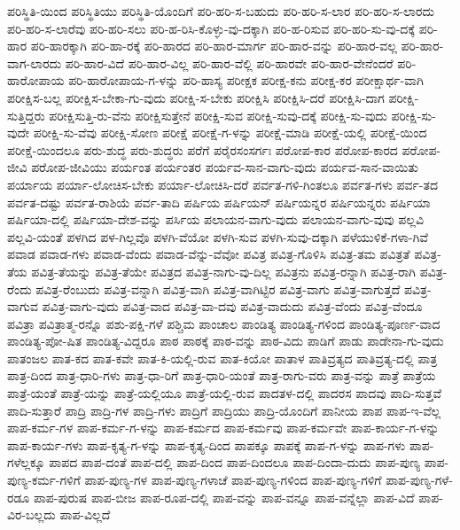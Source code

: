 {ಪರಿಸ್ಥಿತಿ-ಯಿಂದ
ಪರಿಸ್ಥಿತಿಯು
ಪರಿಸ್ಥಿತಿ-ಯೊಂದಿಗೆ
ಪರಿ-ಹರಿ-ಸ-ಬಹುದು
ಪರಿ-ಹರಿ-ಸ-ಲಾರ
ಪರಿ-ಹರಿ-ಸ-ಲಾರದು
ಪರಿ-ಹರಿ-ಸ-ಲಾರೆವು
ಪರಿ-ಹರಿ-ಸಲು
ಪರಿ-ಹ-ರಿಸಿ-ಕೊಳ್ಳು-ವು-ದಕ್ಕಾಗಿ
ಪರಿ-ಹ-ರಿಸುವ
ಪರಿ-ಹರಿ-ಸು-ವು-ದಕ್ಕೆ
ಪರಿ-ಹಾರ
ಪರಿ-ಹಾರಕ್ಕಾಗಿ
ಪರಿ-ಹಾ-ರಕ್ಕೆ
ಪರಿ-ಹಾರದ
ಪರಿ-ಹಾರ-ಮಾರ್ಗ
ಪರಿ-ಹಾರ-ವನ್ನು
ಪರಿ-ಹಾರ-ವಲ್ಲ
ಪರಿ-ಹಾರ-ವಾಗ-ಲಾರದು
ಪರಿ-ಹಾರ-ವಿದೆ
ಪರಿ-ಹಾರ-ವಿಲ್ಲ
ಪರಿ-ಹಾರ-ವೆಲ್ಲಿ
ಪರಿ-ಹಾರವೇ
ಪರಿ-ಹಾರ-ವೇನೆಂದರೆ
ಪರಿ-ಹಾರೋಪಾಯ
ಪರಿ-ಹಾರೋಪಾಯ-ಗ-ಳನ್ನು
ಪರಿ-ಹಾಸ್ಯ
ಪರೀಕ್ಷಕ
ಪರೀಕ್ಷ-ಕನು
ಪರೀಕ್ಷ-ಕರ
ಪರೀಕ್ಷಾರ್ಥ-ವಾಗಿ
ಪರೀಕ್ಷಿಸ-ಬಲ್ಲ
ಪರೀಕ್ಷಿಸ-ಬೇಕಾ-ಗು-ವುದು
ಪರೀಕ್ಷಿ-ಸ-ಬೇಕು
ಪರೀಕ್ಷಿಸಿ
ಪರೀಕ್ಷಿಸಿ-ದರೆ
ಪರೀಕ್ಷಿಸಿ-ದಾಗ
ಪರೀಕ್ಷಿ-ಸುತ್ತಿದ್ದರು
ಪರೀಕ್ಷಿಸುತ್ತಿ-ರು-ವೆನು
ಪರೀಕ್ಷಿಸುತ್ತೇನೆ
ಪರೀಕ್ಷಿ-ಸುವ
ಪರೀಕ್ಷಿ-ಸುವು-ದಕ್ಕೆ
ಪರೀಕ್ಷಿ-ಸು-ವುದು
ಪರೀಕ್ಷಿ-ಸು-ವುದೇ
ಪರೀಕ್ಷಿ-ಸು-ವೆವು
ಪರೀಕ್ಷಿ-ಸೋಣ
ಪರೀಕ್ಷೆ
ಪರೀಕ್ಷೆ-ಗ-ಳನ್ನು
ಪರೀಕ್ಷೆ-ಮಾಡಿ
ಪರೀಕ್ಷೆ-ಯಲ್ಲಿ
ಪರೀಕ್ಷೆ-ಯಿಂದ
ಪರೀಕ್ಷೆ-ಯಿಂದಲೂ
ಪರು-ಶುದ್ಧ
ಪರು-ಶುದ್ಧರು
ಪರೆಗೆ
ಪರೈರಸಂಸರ್ಗಃ
ಪರೋಪ-ಕಾರ
ಪರೋಪ-ಕಾರದ
ಪರೋಪ-ಜೀವಿ
ಪರೋಪ-ಜೀವಿಯು
ಪರ್ಯಂತ
ಪರ್ಯಂತರ
ಪರ್ಯವ-ಸಾನ-ವಾಗು-ವುದು
ಪರ್ಯವ-ಸಾನ-ವಾಯಿತು
ಪರ್ಯಾಯ
ಪರ್ಯಾ-ಲೋಚಿಸ-ಬೇಕು
ಪರ್ಯಾ-ಲೋಚಿಸಿ-ದರೆ
ಪರ್ವತ-ಗಳಿ-ಗಿಂತಲೂ
ಪರ್ವತ-ಗಳು
ಪರ್ವ-ತದ
ಪರ್ವತ-ದಷ್ಟು
ಪರ್ವತ-ರಾಶಿಯೆ
ಪರ್ವ-ತಾದಿ
ಪರ್ಷಿಯ
ಪರ್ಷಿಯನ್
ಪರ್ಷಿಯನ್ನರ
ಪರ್ಷಿಯನ್ನರು
ಪರ್ಷಿಯಾ
ಪರ್ಷಿಯಾ-ದಲ್ಲಿ
ಪರ್ಷಿಯಾ-ದೇಶ-ವನ್ನು
ಪರ್ಸಿಯ
ಪಲಾಯನ-ವಾಗು-ವುದು
ಪಲಾಯನ-ವಾಗು-ವುವು
ಪಲ್ಲವಿ
ಪಲ್ಲವಿ-ಯಂತೆ
ಪಳಗಿದ
ಪಳ-ಗಿಲ್ಲವೊ
ಪಳಗಿ-ವೆಯೋ
ಪಳಗಿ-ಸುವ
ಪಳಗಿ-ಸುವು-ದಕ್ಕಾಗಿ
ಪಳೆಯುಳಿಕೆ-ಗಳಾ-ಗಿವೆ
ಪವಾಡ
ಪವಾಡ-ಗಳು
ಪವಾಡ-ವೆಂದು
ಪವಾಡ-ವೆನ್ನು-ವೆವೋ
ಪವಿತ್ರ
ಪವಿತ್ರ-ಗೊಳಿಸಿ
ಪವಿತ್ರ-ತಮ
ಪವಿತ್ರತೆ
ಪವಿತ್ರ-ತೆಯ
ಪವಿತ್ರ-ತೆಯನ್ನು
ಪವಿತ್ರ-ತೆಯೇ
ಪವಿತ್ರದ
ಪವಿತ್ರ-ನಾಗು-ವು-ದಿಲ್ಲ
ಪವಿತ್ರನು
ಪವಿತ್ರ-ರನ್ನಾಗಿ
ಪವಿತ್ರ-ರಾಗಿ
ಪವಿತ್ರ-ರೆಂದು
ಪವಿತ್ರ-ರೆಂಬುದು
ಪವಿತ್ರ-ವನ್ನಾಗಿ
ಪವಿತ್ರ-ವಾಗಿ
ಪವಿತ್ರ-ವಾಗಿಟ್ಟಿರ
ಪವಿತ್ರ-ವಾಗು
ಪವಿತ್ರ-ವಾಗುತ್ತದೆ
ಪವಿತ್ರ-ವಾಗುವ
ಪವಿತ್ರ-ವಾಗು-ವುದು
ಪವಿತ್ರ-ವಾದ
ಪವಿತ್ರ-ವಾ-ದವು
ಪವಿತ್ರ-ವಾದುದು
ಪವಿತ್ರ-ವೆಂದು
ಪವಿತ್ರ-ವೆಂದೂ
ಪವಿತ್ರಾ
ಪವಿತ್ರಾತ್ಮ-ರನ್ನೊ
ಪಶು-ಪಕ್ಷಿ-ಗಳೆ
ಪಶ್ಚಿಮ
ಪಾಂಚಾಲ
ಪಾಂಡಿತ್ಯ
ಪಾಂಡಿತ್ಯ-ಗಳಿಂದ
ಪಾಂಡಿತ್ಯ-ಪೂರ್ಣ-ವಾದ
ಪಾಂಡಿತ್ಯ-ಪೋ-ಷಿತ
ಪಾಂಡಿತ್ಯ-ವಿದ್ದರೂ
ಪಾಠ
ಪಾಠಕ್ಕೆ
ಪಾಠ-ವನ್ನು
ಪಾಠ-ವಿದು
ಪಾಡಿಗೆ
ಪಾಡು
ಪಾಡೇನಾ-ಗು-ವುದು
ಪಾತಂಜಲ
ಪಾತ-ಕದ
ಪಾತ-ಕವೇ
ಪಾತ-ಕಿ-ಯಲ್ಲಿ-ರುವ
ಪಾತ-ಕಿಯೋ
ಪಾತಾಳ
ಪಾತಿವ್ರತ್ಯದ
ಪಾತಿವ್ರತ್ಯ-ದಲ್ಲಿ
ಪಾತ್ರ
ಪಾತ್ರ-ದಿಂದ
ಪಾತ್ರ-ಧಾರಿ-ಗಳು
ಪಾತ್ರ-ಧಾ-ರಿಗೆ
ಪಾತ್ರ-ಧಾರಿ-ಯಂತೆ
ಪಾತ್ರ-ರಾಗು-ವರು
ಪಾತ್ರ-ವನ್ನು
ಪಾತ್ರೆ
ಪಾತ್ರೆಯ
ಪಾತ್ರೆ-ಯಂತೆ
ಪಾತ್ರೆ-ಯನ್ನು
ಪಾತ್ರೆ-ಯಲ್ಲಿಯೂ
ಪಾತ್ರೆ-ಯಲ್ಲಿ-ರುವ
ಪಾದತಳ-ದಲ್ಲಿ
ಪಾದರಸ
ಪಾದವು
ಪಾದಿ-ಸುತ್ತವೆ
ಪಾದಿ-ಸುತ್ತಾರೆ
ಪಾದ್ರಿ
ಪಾದ್ರಿ-ಗಳ
ಪಾದ್ರಿ-ಗಳು
ಪಾದ್ರಿಗೆ
ಪಾದ್ರಿಯು
ಪಾದ್ರಿ-ಯೊಂದಿಗೆ
ಪಾನೀಯ
ಪಾಪ
ಪಾಪ-ಇ-ವೆಲ್ಲ
ಪಾಪ-ಕರ್ಮ-ಗಳ
ಪಾಪ-ಕರ್ಮ-ಗ-ಳನ್ನು
ಪಾಪ-ಕರ್ಮದ
ಪಾಪ-ಕರ್ಮವು
ಪಾಪ-ಕರ್ಮವೇ
ಪಾಪ-ಕಾರ್ಯ-ಗ-ಳನ್ನು
ಪಾಪ-ಕಾರ್ಯ-ಗಳು
ಪಾಪ-ಕೃತ್ಯ-ಗ-ಳನ್ನು
ಪಾಪ-ಕೃತ್ಯ-ದಿಂದ
ಪಾಪಕ್ಕೂ
ಪಾಪಕ್ಕೆ
ಪಾಪ-ಗ-ಳನ್ನು
ಪಾಪ-ಗಳು
ಪಾಪ-ಗಳೆಲ್ಲಕ್ಕೂ
ಪಾಪದ
ಪಾಪ-ದಂತೆ
ಪಾಪ-ದಲ್ಲಿ
ಪಾಪ-ದಿಂದ
ಪಾಪ-ದಿಂದಲೂ
ಪಾಪ-ದಿಂದಾ-ದುದು
ಪಾಪ-ಪುಣ್ಯ
ಪಾಪ-ಪುಣ್ಯ-ಕರ್ಮ-ಗಳಿಗೆ
ಪಾಪ-ಪುಣ್ಯ-ಗಳ
ಪಾಪ-ಪುಣ್ಯ-ಗಳಾಚೆ
ಪಾಪ-ಪುಣ್ಯ-ಗಳಿಂದ
ಪಾಪ-ಪುಣ್ಯ-ಗಳಿಗೆ
ಪಾಪ-ಪುಣ್ಯ-ಗಳೆ-ರಡೂ
ಪಾಪ-ಪುರುಷ
ಪಾಪ-ಬೀಜ
ಪಾಪ-ರೂಪ-ದಲ್ಲಿ
ಪಾಪ-ವನ್ನು
ಪಾಪ-ವನ್ನೂ
ಪಾಪ-ವನ್ನೆಲ್ಲಾ
ಪಾಪ-ವಿದೆ
ಪಾಪ-ವಿರ-ಬಲ್ಲದು
ಪಾಪ-ವಿಲ್ಲದೆ
}
